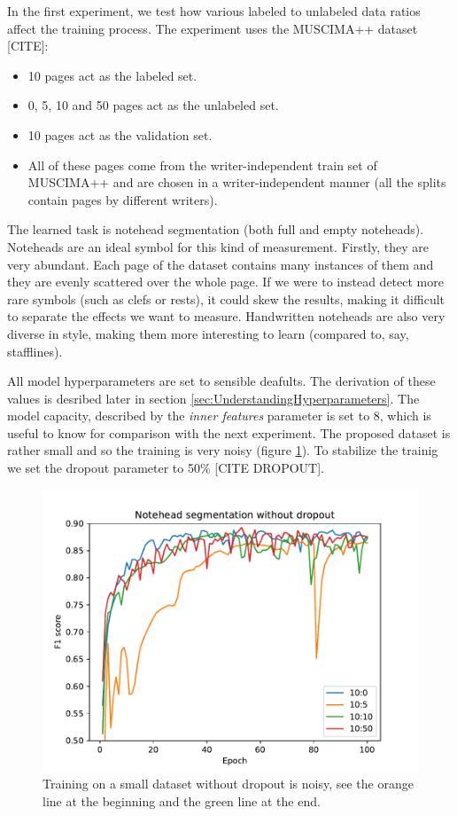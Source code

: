In the first experiment, we test how various labeled to unlabeled data ratios affect the training process. The experiment uses the MUSCIMA++ dataset [CITE]:

\begin{itemize}
    \item 10 pages act as the labeled set.
    \item 0, 5, 10 and 50 pages act as the unlabeled set.
    \item 10 pages act as the validation set.
    \item All of these pages come from the writer-independent train set of MUSCIMA++ and are chosen in a writer-independent manner (all the splits contain pages by different writers).
\end{itemize}

The learned task is notehead segmentation (both full and empty noteheads). Noteheads are an ideal symbol for this kind of measurement. Firstly, they are very abundant. Each page of the dataset contains many instances of them and they are evenly scattered over the whole page. If we were to instead detect more rare symbols (such as clefs or rests), it could skew the results, making it difficult to separate the effects we want to measure. Handwritten noteheads are also very diverse in style, making them more interesting to learn (compared to, say, stafflines).

All model hyperparameters are set to sensible deafults. The derivation of these values is desribed later in section \ref{sec:UnderstandingHyperparameters}. The model capacity, described by the \emph{inner features} parameter is set to 8, which is useful to know for comparison with the next experiment. The proposed dataset is rather small and so the training is very noisy (figure \ref{fig:ExplorationNoteheadsNoDropout}). To stabilize the trainig we set the dropout parameter to 50\% [CITE DROPOUT].

\begin{figure}[ht]
    \centering
    \includegraphics[width=140mm]{../../figures/01-exploration-noteheads/noteheads.pdf}
    \caption{Training on a small dataset without dropout is noisy, see the orange line at the beginning and the green line at the end.}
    \label{fig:ExplorationNoteheadsNoDropout}
\end{figure}

